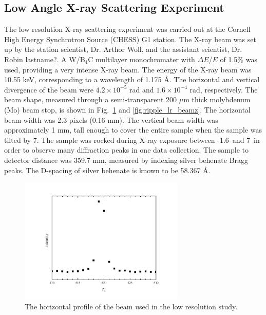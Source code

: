 \subsection{Low Angle X-ray Scattering Experiment}
The low resolution X-ray scattering experiment was carried out at the Cornell 
High Energy Synchrotron Source (CHESS) G1 station. The X-ray beam was 
set up by the station scientist, Dr. Arthor Woll, and the assistant 
scientist, Dr. Robin lastname?.
A W/B$_4$C multilayer monochromater with $\Delta E$/$E$ of 1.5\% was used,
providing a very intense X-ray beam. 
The energy of the X-ray beam was 10.55 keV, corresponding to a wavelength 
of 1.175 \AA. 
The horizontal and vertical divergence of the beam were
$4.2 \times 10^{-5}$ rad and $1.6 \times 10^{-4}$ rad, respectively.
The beam shape, measured through a semi-transparent 200 $\mu$m thick
molybdenum (Mo) beam stop, is shown in Fig.~\ref{fig:ripple_lr_beamx}
and \ref{fig:ripple_lr_beamz}.
The horizontal beam width was 2.3 pixels (0.16 mm). The vertical beam
width was approximately 1 mm, tall enough to cover the entire sample
when the sample was tilted by 7\textdegree. The sample was rocked
during X-ray exposure between -1.6\textdegree\ and 7\textdegree\ 
in order to observe many diffraction peaks in one data collection. 
The sample to detector distance was 359.7 mm, measured by indexing
silver behenate Bragg peaks. The D-spacing of silver behenate is known to be
58.367 \AA.

\begin{figure}[htbp]
  \centering
  \includegraphics[width=0.7\textwidth]{figures/ripple/beamx_lr}
  \caption{The horizontal profile of the beam used in the low resolution study.}
  \label{fig:ripple_lr_beamx}
\end{figure}

